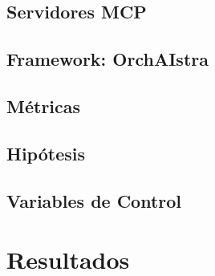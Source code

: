 \documentclass[runningheads]{llncs}
\begin{document}

\subsection{Servidores MCP}
\label{sec:servers}

\subsection{Framework: OrchAIstra}
\label{sec:framework}

\subsection{M\'etricas}
\label{sec:metrics}

\subsection{Hip\'otesis}
\label{sec:hypotheses}

\subsection{Variables de Control}
\label{sec:controls}

%
\section{Resultados}
\label{sec:results}
\end{document}
